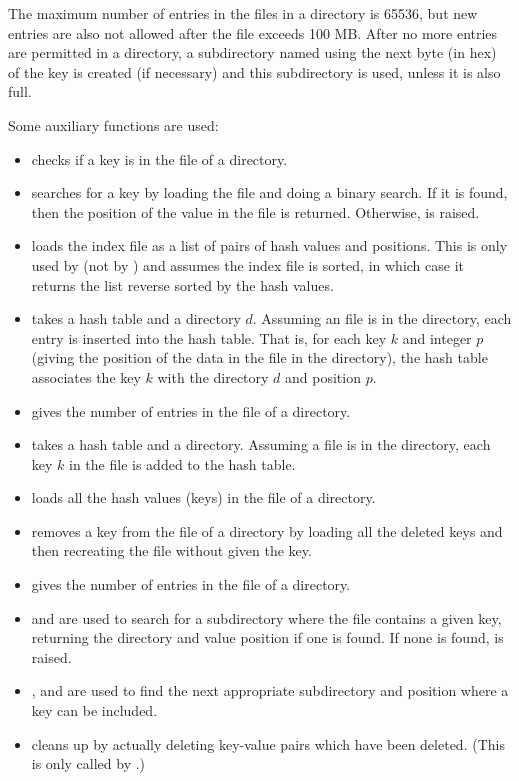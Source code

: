 The maximum number of entries in the files in a directory is 65536,
but new entries are also not allowed after the {} file
exceeds 100 MB.
After no more entries are permitted in a directory,
a subdirectory named using the next byte (in hex) of the key is
created (if necessary) and this subdirectory is used, unless it is also full.

Some auxiliary functions are used:
\begin{itemize}
\item {} checks if a key is in the {} file of a directory.
\item {}
searches for a key
by loading the {} file and doing a binary search.
If it is found, then the position of the value in the {}
file is returned. Otherwise, {} is raised.
\item {} loads the index file as a list of pairs of hash values and positions.
This is only used by {} (not by {}) and assumes the index file is sorted,
in which case it returns the list reverse sorted by the hash values.
\item {} takes a hash table and a directory $d$.
Assuming an {} file is in the directory, each entry is inserted into the hash table.
That is, for each key $k$ and integer $p$ (giving the position of the data in the {} file
in the directory), the hash table associates the key $k$ with the directory $d$ and position $p$.
\item {} gives the number of entries in the {} file of a directory.
\item {} takes a hash table and a directory.
Assuming a {} file is in the directory, each key $k$ in the file is added to the hash table.
\item {} loads all the hash values (keys) in the {} file of a directory.
\item {} removes a key from the {} file of a directory
by loading all the deleted keys and then recreating the {} file without given the key.
\item {} gives the number of entries in the {} file of a directory.
\item {} and {}
are used to search for a subdirectory where the {} file
contains a given key, returning the directory and value position
if one is found. If none is found, {}
is raised.
\item {}, {} and {}
are used to find the next appropriate subdirectory and position where a key
can be included.
\item {} cleans up by actually deleting key-value pairs which have been deleted. (This is only called by {}.)
\end{itemize}

